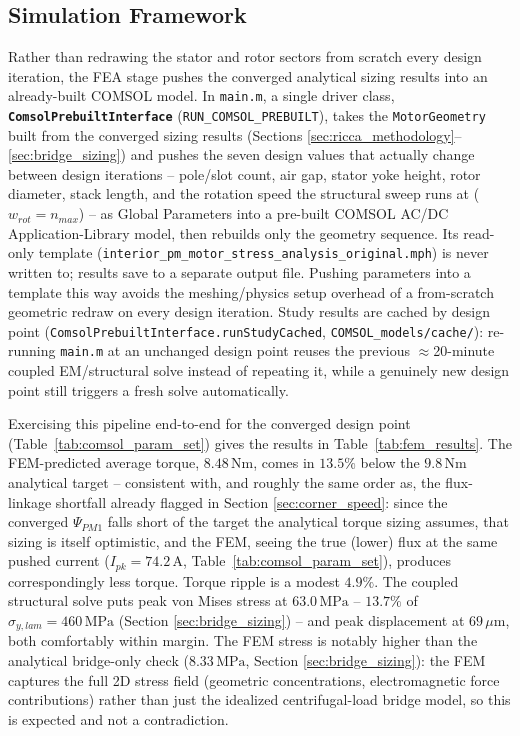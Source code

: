 \documentclass[11pt,a4paper]{article}
\begin{document}
\subsection{Simulation Framework}
\label{sec:sim_framework}
Rather than redrawing the stator and rotor sectors from scratch every design iteration, the FEA stage pushes the converged analytical sizing results into an already-built COMSOL model. In \texttt{main.m}, a single driver class, \textbf{\texttt{ComsolPrebuiltInterface}} (\texttt{RUN\_COMSOL\_PREBUILT}), takes the \texttt{MotorGeometry} built from the converged sizing results (Sections \ref{sec:ricca_methodology}--\ref{sec:bridge_sizing}) and pushes the seven design values that actually change between design iterations -- pole/slot count, air gap, stator yoke height, rotor diameter, stack length, and the rotation speed the structural sweep runs at ($w_{rot}=n_{max}$) -- as Global Parameters into a pre-built COMSOL AC/DC Application-Library model, then rebuilds only the geometry sequence. Its read-only template (\texttt{interior\_pm\_motor\_stress\_analysis\_original.mph}) is never written to; results save to a separate output file. Pushing parameters into a template this way avoids the meshing/physics setup overhead of a from-scratch geometric redraw on every design iteration. Study results are cached by design point (\texttt{ComsolPrebuiltInterface.runStudyCached}, \texttt{COMSOL\_models/cache/}): re-running \texttt{main.m} at an unchanged design point reuses the previous $\approx$20-minute coupled EM/structural solve instead of repeating it, while a genuinely new design point still triggers a fresh solve automatically.

Exercising this pipeline end-to-end for the converged design point (Table~\ref{tab:comsol_param_set}) gives the results in Table~\ref{tab:fem_results}. The FEM-predicted average torque, $8.48\,\text{Nm}$, comes in $13.5\%$ below the $9.8\,\text{Nm}$ analytical target -- consistent with, and roughly the same order as, the flux-linkage shortfall already flagged in Section \ref{sec:corner_speed}: since the converged $\Psi_{PM1}$ falls short of the target the analytical torque sizing assumes, that sizing is itself optimistic, and the FEM, seeing the true (lower) flux at the same pushed current ($I_{pk}=74.2\,\text{A}$, Table~\ref{tab:comsol_param_set}), produces correspondingly less torque. Torque ripple is a modest $4.9\%$. The coupled structural solve puts peak von Mises stress at $63.0\,\text{MPa}$ -- $13.7\%$ of $\sigma_{y,lam}=460\,\text{MPa}$ (Section \ref{sec:bridge_sizing}) -- and peak displacement at $69\,\mu\text{m}$, both comfortably within margin. The FEM stress is notably higher than the analytical bridge-only check ($8.33\,\text{MPa}$, Section \ref{sec:bridge_sizing}): the FEM captures the full 2D stress field (geometric concentrations, electromagnetic force contributions) rather than just the idealized centrifugal-load bridge model, so this is expected and not a contradiction.
\end{document}
